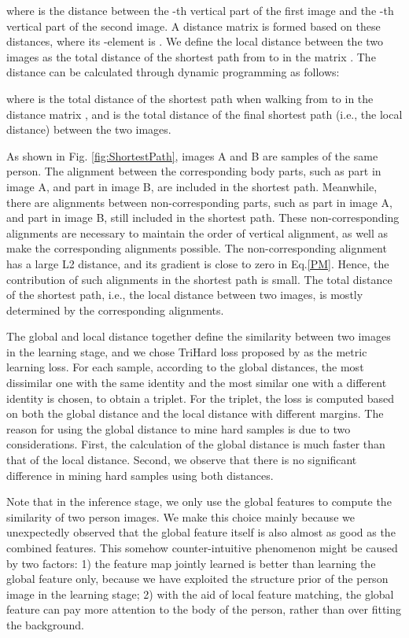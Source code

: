 \documentclass[10pt,twocolumn,letterpaper]{article}
\begin{document}
where  is the distance between the -th vertical part of the first image and the -th vertical part of the second image. A distance matrix  is formed based on these distances, where its -element is . We define the local distance between the two images as the total distance of the shortest path from  to  in the matrix . The distance can be calculated through dynamic programming as follows:

where  is the total distance of the shortest path when walking from  to  in the distance matrix , and  is the total distance of the final shortest path (i.e., the local distance) between the two images.

As shown in Fig. \ref{fig:ShortestPath}, images A and B are samples of the same person.
The alignment between the corresponding body parts, such as part  in image A, and part  in image B, are included in the shortest path.
Meanwhile, there are alignments between non-corresponding parts, such as part  in image A, and part  in image B, still included in the shortest path.
These non-corresponding alignments are necessary to maintain the order of vertical alignment, as well as make the corresponding alignments possible.
The non-corresponding alignment has a large L2 distance, and its gradient is close to zero in Eq.\ref{PM}.
Hence, the contribution of such alignments in the shortest path is small. 
The total distance of the shortest path, i.e., the local distance between two images, is mostly determined by the corresponding alignments.

The global and local distance together define the similarity between two images in the learning stage, and we chose TriHard loss proposed by \cite{hermans2017defense} as the metric learning loss.
For each sample, according to the global distances, the most dissimilar one with the same identity and the most similar one with a different identity is chosen, to obtain a triplet.
For the triplet, the loss is computed based on both the global distance and the local distance with different margins.
The reason for using the global distance to mine hard samples is due to two considerations.
First, the calculation of the global distance is much faster than that of the local distance.
Second, we observe that there is no significant difference in mining hard samples using both distances.

Note that in the inference stage, we only use the global features to compute the similarity of two person images. We make this choice mainly because we unexpectedly observed that the global feature itself is also almost as good as the combined features. This somehow counter-intuitive phenomenon might be caused by two factors: 1) the feature map jointly learned is better than learning the global feature only, because we have exploited the structure prior of the person image in the learning stage; 2) with the aid of local feature matching, the global feature can pay more attention to the body of the person, rather than over fitting the background.  
\end{document}
